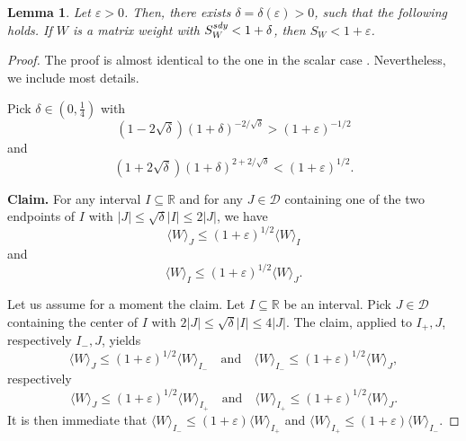 \documentclass{amsart}
\newcommand{\R}{\mathbb{R}}
\newcommand{\cD}{\mathcal{D}}
\newcommand{\e}{\varepsilon}
\newtheorem{lem}[thm]{Lemma}
\theoremstyle{definition}
\theoremstyle{remark}
\begin{document}
    \begin{lem}
		Let $\e>0$. Then, there exists $\delta=\delta(\e)>0$, such that the following holds. If $W$ is a matrix weight with $S_{W}^{\emph{sdy}}<1+\delta$, then $S_{W}<1+\e$.
	\end{lem}

	\begin{proof}
		The proof is almost identical to the one in the scalar case \cite{Na}. Nevertheless, we include most details.
		
		Pick $\delta\in\left(0,\frac{1}{4}\right)$ with
		\begin{equation*}
			(1-2\sqrt{\delta})(1+\delta)^{-2/\sqrt{\delta}}>(1+\e)^{-1/2}
		\end{equation*}
		and
		\begin{equation*}
			(1+2\sqrt{\delta})(1+\delta)^{2+2/\sqrt{\delta}}<(1+\e)^{1/2}.
		\end{equation*}
		
		\medskip
		
		\textbf{Claim.} For any interval $I\subseteq\R$ and for any $J\in\cD$ containing one of the two endpoints of $I$ with $|J|\leq\sqrt{\delta}|I|\leq 2|J|$, we have
		\begin{equation*}
			\langle W\rangle_{J}\leq(1+\e)^{1/2}\langle W\rangle_{I}
		\end{equation*}
		and
		\begin{equation*}
			\langle W\rangle_{I}\leq(1+\e)^{1/2}\langle W\rangle_{J}.
		\end{equation*}
		
		\medskip
		
		Let us assume for a moment the claim. Let $I\subseteq\R$ be an interval. Pick $J\in\cD$ containing the center of $I$ with $2|J|\leq\sqrt{\delta}|I|\leq 4|J|$. The claim, applied to $I_{+},J$, respectively $I_{-},J$, yields
		\begin{equation*}
			\langle W\rangle_{J}\leq(1+\e)^{1/2}\langle W\rangle_{I_{-}}\quad\text{and}\quad\langle W\rangle_{I_{-}}\leq(1+\e)^{1/2}\langle W\rangle_{J},
		\end{equation*}
		respectively
		\begin{equation*}
			\langle W\rangle_{J}\leq(1+\e)^{1/2}\langle W\rangle_{I_{+}}\quad\text{and}\quad\langle W\rangle_{I_{+}}\leq(1+\e)^{1/2}\langle W\rangle_{J}.
		\end{equation*}
		It is then immediate that $\langle W\rangle_{I_{-}}\leq(1+\e)\langle W\rangle_{I_{+}}$ and $\langle W\rangle_{I_{+}}\leq(1+\e)\langle W\rangle_{I_{-}}$.
		

\end{proof}
\end{document}
